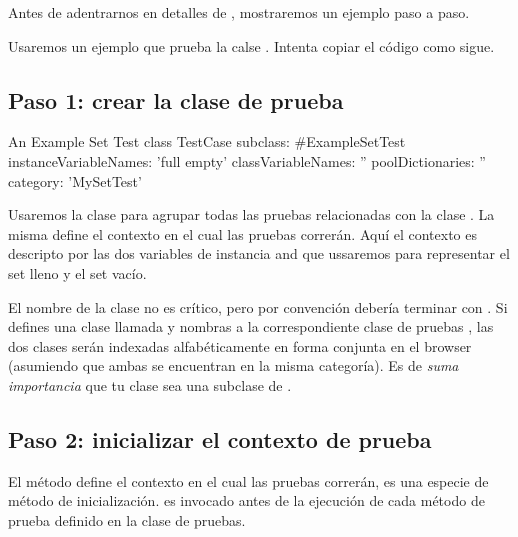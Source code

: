 \documentclass[a4paper,10pt,twoside]{book}
\begin{document}
Antes de adentrarnos en detalles de \SUnit, mostraremos un ejemplo
paso a paso.

Usaremos un ejemplo que prueba la calse . Intenta copiar el código como sigue.

\subsection{Paso 1: crear la clase de prueba}


\begin{classdef}[exampleSetTest]{An Example Set Test class}
TestCase subclass: #ExampleSetTest
	instanceVariableNames: 'full empty'
	classVariableNames: ''
	poolDictionaries: ''
	category: 'MySetTest'
\end{classdef}


Usaremos la clase  para agrupar todas las pruebas relacionadas con
la clase .  La misma define el contexto en el cual las pruebas
correrán. Aquí el contexto es descripto por las dos variables de instancia  and 
que ussaremos para representar el set lleno y el set vacío.

El nombre de la clase no es crítico, pero por convención debería terminar con .
Si defines una clase llamada  y nombras a la correspondiente clase de pruebas ,
las dos clases serán indexadas alfabéticamente en forma conjunta en el browser (asumiendo
que ambas se encuentran en la misma categoría).  Es de \emph{suma importancia} que tu clase 
sea una subclase de .

\subsection{Paso 2: inicializar el contexto de prueba}

El método  define el contexto en el cual las
pruebas correrán, es una especie de método de inicialización.
 es invocado antes de la ejecución de cada método de  prueba definido
en la clase de pruebas.

\end{document}
